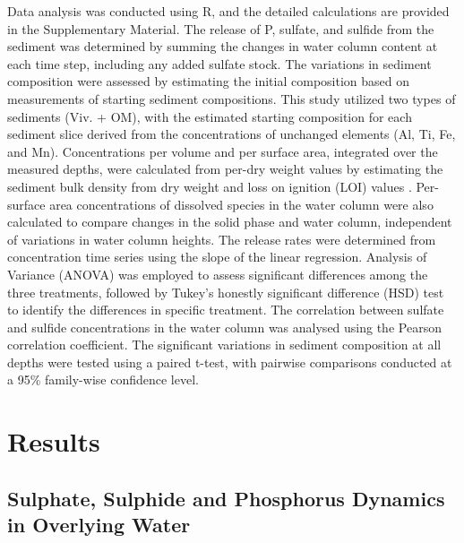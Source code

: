 \documentclass[12pt,twoside]{book}
\begin{document}
Data analysis was conducted using R, and the detailed calculations are provided in the Supplementary Material. The release of P, sulfate, and sulfide from the sediment was determined by summing the changes in water column content at each time step, including any added sulfate stock. The variations in sediment composition were assessed by estimating the initial composition based on measurements of starting sediment compositions. This study utilized two types of sediments (Viv. + OM), with the estimated starting composition for each sediment slice derived from the concentrations of unchanged elements (Al, Ti, Fe, and Mn). Concentrations per volume and per surface area, integrated over the measured depths, were calculated from per-dry weight values by estimating the sediment bulk density from dry weight and loss on ignition (LOI) values \citep{Avnimelech2001}.
Per-surface area concentrations of dissolved species in the water column were also calculated to compare changes in the solid phase and water column, independent of variations in water column heights. The release rates were determined from concentration time series using the slope of the linear regression. Analysis of Variance (ANOVA) was employed to assess significant differences among the three treatments, followed by Tukey's honestly significant difference (HSD) test to identify the differences in specific treatment. The correlation between sulfate and sulfide concentrations in the water column was analysed using the Pearson correlation coefficient. The significant variations in sediment composition at all depths were tested using a paired t-test, with pairwise comparisons conducted at a 95\% family-wise confidence level.

\section{Results}\label{results}

\subsection{Sulphate, Sulphide and Phosphorus Dynamics in Overlying Water}\label{sulphate-sulphide-and-phosphorus-dynamics-in-overlying-water}
\end{document}
